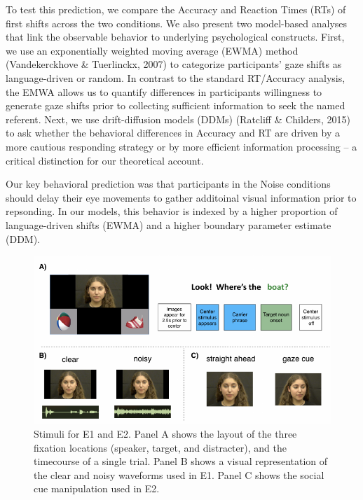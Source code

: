 \documentclass[10pt, letterpaper]{article}
\newenvironment{CodeChunk}{}{}
\begin{document}
To test this prediction, we compare the Accuracy and Reaction Times
(RTs) of first shifts across the two conditions. We also present two
model-based analyses that link the observable behavior to underlying
psychological constructs. First, we use an exponentially weighted moving
average (EWMA) method (Vandekerckhove \& Tuerlinckx, 2007) to categorize
participants' gaze shifts as language-driven or random. In contrast to
the standard RT/Accuracy analysis, the EMWA allows us to quantify
differences in participants willingness to generate gaze shifts prior to
collecting sufficient information to seek the named referent. Next, we
use drift-diffusion models (DDMs) (Ratcliff \& Childers, 2015) to ask
whether the behavioral differences in Accuracy and RT are driven by a
more cautious responding strategy or by more efficient information
processing -- a critical distinction for our theoretical account.

Our key behavioral prediction was that participants in the Noise
conditions should delay their eye movements to gather additoinal visual
information prior to repsonding. In our models, this behavior is indexed
by a higher proportion of language-driven shifts (EWMA) and a higher
boundary parameter estimate (DDM).

\begin{CodeChunk}
\begin{figure}[tb]

{\centering \includegraphics[width=0.9\linewidth]{figs/stimuli_plot-1} 

}

\caption[Stimuli for E1 and E2]{Stimuli for E1 and E2. Panel A shows the layout of the three fixation locations (speaker, target, and distracter), and the timecourse of a single trial. Panel B shows a visual representation of the clear and noisy waveforms used in E1. Panel C shows the social cue manipulation used in E2.}\label{fig:stimuli_plot}
\end{figure}
\end{CodeChunk}
\end{document}
